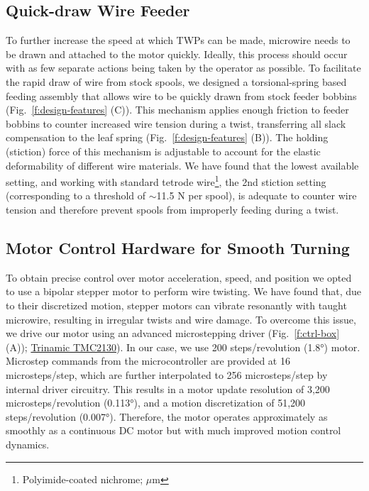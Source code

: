 \documentclass[11pt,a4paper]{article}
\begin{document}
\subsection{Quick-draw Wire Feeder}
To further increase the speed at which TWPs can be made, microwire needs to be
drawn and attached to the motor quickly. Ideally, this process should occur
with as few separate actions being taken by the operator as possible. To
facilitate the rapid draw of wire from stock spools, we designed a
torsional-spring based feeding assembly that allows wire to be quickly drawn
from stock feeder bobbins (Fig.~\ref{f:design-features} (C)). This mechanism
applies enough friction to feeder bobbins to counter increased wire tension
during a twist, transferring all slack compensation to the leaf spring
(Fig.~\ref{f:design-features} (B)). The holding (stiction) force of this
mechanism is adjustable to account for the elastic deformability of different
wire materials. We have found that the lowest available setting, and working
with standard tetrode wire\footnote{Polyimide-coated nichrome;
$\mu$m}, the 2nd stiction setting (corresponding to a threshold of
$\sim$11.5 N per spool), is adequate to counter wire tension and therefore
prevent spools from improperly feeding during a twist.

\subsection{Motor Control Hardware for Smooth Turning}
To obtain precise control over motor acceleration, speed, and position we opted
to use a bipolar stepper motor to perform wire twisting. We have found that,
due to their discretized motion, stepper motors can vibrate resonantly with
taught microwire, resulting in irregular twists and wire damage. To overcome
this issue, we drive our motor using an advanced microstepping driver
(Fig.~\ref{f:ctrl-box} (A));
\href{https://www.trinamic.com/products/integrated-circuits/details/tmc2100/}{Trinamic
TMC2130}). In our case, we use 200 steps/revolution (\ang{1.8})
motor. Microstep commands from the microcontroller are provided at 16
microsteps/step, which are further interpolated to 256 microsteps/step by
internal driver circuitry. This results in a motor update resolution of 3,200
microsteps/revolution (\ang{0.113}), and a motion discretization of 51,200
steps/revolution (\ang{0.007}). Therefore, the motor operates approximately as
smoothly as a continuous DC motor but with much improved motion control
dynamics.
\end{document}
